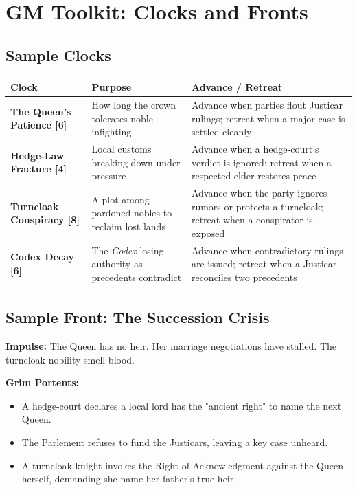 \documentclass[11pt,twoside]{book}
\begin{document}
\chapter{GM Toolkit: Clocks and Fronts}

\section{Sample Clocks}

\begin{longtable}{@{}p{2.5cm}p{4cm}p{5cm}@{}}
\toprule
\textbf{Clock} & \textbf{Purpose} & \textbf{Advance / Retreat} \\
\midrule
\endhead
\textbf{The Queen's Patience [6]} & How long the crown tolerates noble infighting & Advance when parties flout Justicar rulings; retreat when a major case is settled cleanly \\
\addlinespace
\textbf{Hedge-Law Fracture [4]} & Local customs breaking down under pressure & Advance when a hedge-court's verdict is ignored; retreat when a respected elder restores peace \\
\addlinespace
\textbf{Turncloak Conspiracy [8]} & A plot among pardoned nobles to reclaim lost lands & Advance when the party ignores rumors or protects a turncloak; retreat when a conspirator is exposed \\
\addlinespace
\textbf{Codex Decay [6]} & The \textit{Codex} losing authority as precedents contradict & Advance when contradictory rulings are issued; retreat when a Justicar reconciles two precedents \\
\bottomrule
\end{longtable}

\section{Sample Front: The Succession Crisis}

\textbf{Impulse:} The Queen has no heir. Her marriage negotiations have stalled. The turncloak nobility smell blood.

\textbf{Grim Portents:}
\begin{itemize}
    \item A hedge-court declares a local lord has the "ancient right" to name the next Queen.
    \item The Parlement refuses to fund the Justicars, leaving a key case unheard.
    \item A turncloak knight invokes the Right of Acknowledgment against the Queen herself, demanding she name her father's true heir.
\end{itemize}
\end{document}
